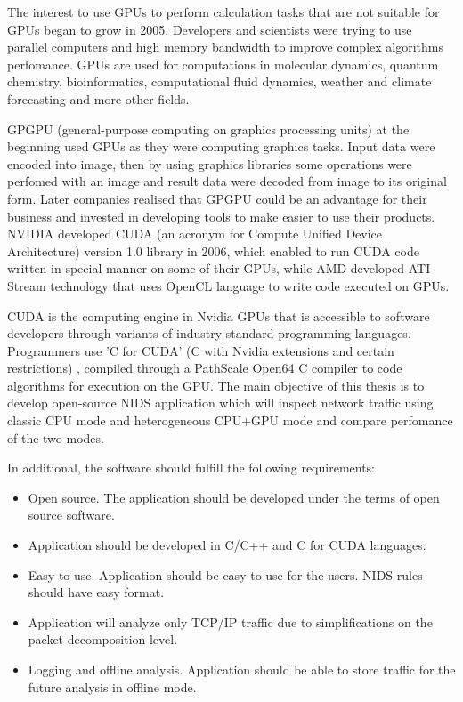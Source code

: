 \documentclass[thesis=M,english]{FITthesis}[2011/07/15]
\begin{document}
The interest to use GPUs to perform calculation tasks that are not suitable for GPUs began to grow in 2005. Developers and scientists were trying to use parallel computers and high memory bandwidth to improve complex algorithms perfomance. GPUs are used for computations in molecular dynamics, quantum chemistry, bioinformatics, computational fluid dynamics, weather and climate forecasting and more other fields.

GPGPU (general-purpose computing on graphics processing units) at the beginning used GPUs as they were computing graphics tasks. Input data were encoded into image, then by using graphics libraries some operations were perfomed with an image and result data were decoded from image to its original form. Later companies realised that GPGPU could be an advantage for their business and invested in developing tools to make easier to use their products. NVIDIA developed CUDA (an acronym for Compute Unified Device Architecture) version 1.0 library in 2006, which enabled to run CUDA code written in special manner on some of their GPUs, while AMD developed ATI Stream technology that uses OpenCL language to write code executed on GPUs.

CUDA is the computing engine in Nvidia GPUs that is accessible to software developers through variants of industry standard programming languages. Programmers use 'C for CUDA' (C with Nvidia extensions and certain restrictions) \cite{cuda_guide}, compiled through a PathScale Open64 C compiler to code algorithms for execution on the GPU.
The main objective of this thesis is to develop open-source NIDS application which will inspect network traffic using classic CPU mode and heterogeneous CPU+GPU mode and compare perfomance of the two modes. 

In additional, the software should fulfill the following requirements:
\begin{itemize}
\item Open source. The application should be developed under the terms of open source software.
\item Application should be developed in C/C++ and C for CUDA languages.
\item Easy to use. Application should be easy to use for the users. NIDS rules should have easy format.
\item Application will analyze only TCP/IP traffic due to simplifications on the packet decomposition level.
\item Logging and offline analysis. Application should be able to store traffic for the future analysis in offline mode.
\end{itemize}
\end{document}
